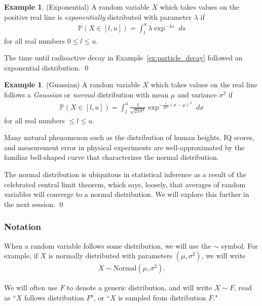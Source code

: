 \documentclass[11pt]{article}
\theoremstyle{definition}
\newtheorem{example}[theorem]{Example}
\renewcommand{\P}{\mathbb{P}}
\begin{document}
\begin{example}(Exponential)
A random variable $X$ which takes values on the positive real line is
\textit{exponentially} distributed with parameter $\lambda$ if
\begin{align}
  \P(X \in [l, u]) =
  \int_{t}^u \lambda \exp^{-\lambda s} \;ds
  \label{eq:exponential}
\end{align}
for all real numbers $0 \leq l \leq u$.

The time until radioactive decay in Example~\ref{ex:particle_decay}
followed an exponential distribution.
\qed
\end{example}

\begin{example}(Guassian)
A random variable $X$ which takes values on the real line follows a
\textit{Gaussian} or \textit{normal} distribution with mean $\mu$ and variance
$\sigma^2$ if
\begin{align}
  \P(X \in [l, u]) =
  \int_{l}^u \frac{1}{\sqrt{2\pi\sigma^2}}
  \exp^{-\frac{1}{2\sigma^2}(x - \mu)^2} \; dx
  \label{eq:normal}
\end{align}
for all real numbers $\leq l \leq u$.

Many natural phenomenon such as the distribution of human heights, IQ scores, and
measurement error in physical experiments are well-approximated by the familiar
bell-shaped curve that characterizes the normal distribution.

The normal distribution is ubiquitous in statistical inference as a result of
the celebrated central limit theorem, which says, loosely, that averages
of random variables will converge to a normal distribution. We will explore this further in the next session.
\qed
\end{example}


\subsubsection*{Notation}

When a random variable follows some distribution,
we will use the $\sim$ symbol. For example,
if $X$ is normally distributed with parameters
$(\mu, \sigma^2)$, we will write
\begin{align*}
  X \sim \text{Normal}(\mu, \sigma^2).
\end{align*}

We will often use $F$ to denote a generic distribution,
and will write $X\sim F$, read as ``$X$ follows distribution $F$", or ``$X$ is sampled from distribution $F$."
\end{document}
